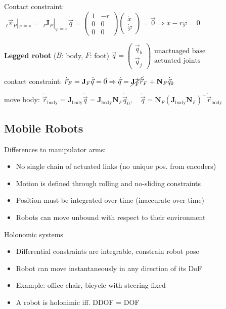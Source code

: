 \documentclass[fontsize=6pt]{scrartcl}
\newcommand{\mat}[1]{\mathbf{#1}}
\begin{document}
\begin{multicols*}{4}
\begin{minipage}{0.65\linewidth}
Contact constraint:
$ ~_I\vec{v}_P|_{\varphi = \pi} = ~_I \mat J_P |_{\varphi = \pi} \dot{\vec q} = \begin{pmatrix}
1 & -r\\
0 & 0\\
0 & 0
\end{pmatrix}
\begin{pmatrix}
\dot x\\
\dot \varphi
\end{pmatrix}
= \vec{0}
\Rightarrow \dot{x} - r \dot \varphi = 0
$

\end{minipage}

\textbf{Legged robot} ($B$: body, $F$: foot)
$\vec{q} = \begin{pmatrix}
\vec q_b\\
\vec q_j
\end{pmatrix}
\begin{matrix}
\text{unactuaged base}\\
\text{actuated joints}
\end{matrix}
$

contact constraint: $\dot{\vec r}_F = \mat J_F \dot{\vec{q}} = \vec{0} \Rightarrow \dot{\vec{q}} = \cancel{\mat J_F^+ \dot{\vec{r}}}_F + \mat N_F \dot{\vec{q}}_0$

move body: $ \dot{\vec r}_\text{body} = \mat J_\text{body} \dot{\vec{q}} = \mat J_\text{body}\mat N_F \dot{\vec{q}}_0, \quad \dot{\vec{q}} = \mat N_F (\mat J_\text{body} \mat N_F)^+\dot{\vec{r}}_\text{body}$

\subsection*{Mobile Robots}
Differences to manipulator arms:
\begin{itemize}
	\item No single chain of actuated links (no unique pos. from encoders)
	\item Motion is defined through rolling and no-sliding constraints
	\item Position must be integrated over time (inaccurate over time)
	\item Robots can move unbound with respect to their environment
\end{itemize}

Holonomic systems
\begin{itemize}
	\item Differential constraints are integrable, constrain robot pose
	\item Robot can move instantaneously in any direction of its DoF
	\item Example: office chair, bicycle with steering fixed
	\item A robot is holonimic iff. DDOF = DOF
\end{itemize}


\end{multicols*}
\end{document}

